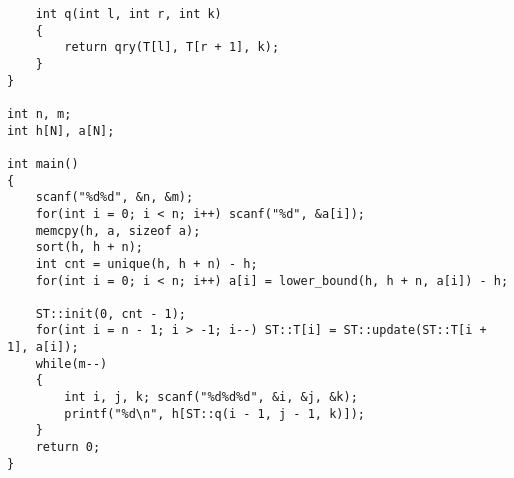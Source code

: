 \begin{lstlisting}
    int q(int l, int r, int k)
    {
        return qry(T[l], T[r + 1], k);
    }
}

int n, m;
int h[N], a[N];

int main()
{
	scanf("%d%d", &n, &m);
    for(int i = 0; i < n; i++) scanf("%d", &a[i]);
    memcpy(h, a, sizeof a);
    sort(h, h + n);
    int cnt = unique(h, h + n) - h;
    for(int i = 0; i < n; i++) a[i] = lower_bound(h, h + n, a[i]) - h;

    ST::init(0, cnt - 1);
    for(int i = n - 1; i > -1; i--) ST::T[i] = ST::update(ST::T[i + 1], a[i]);
    while(m--)
    {
        int i, j, k; scanf("%d%d%d", &i, &j, &k);
        printf("%d\n", h[ST::q(i - 1, j - 1, k)]);
    }
    return 0;
}	
\end{lstlisting}